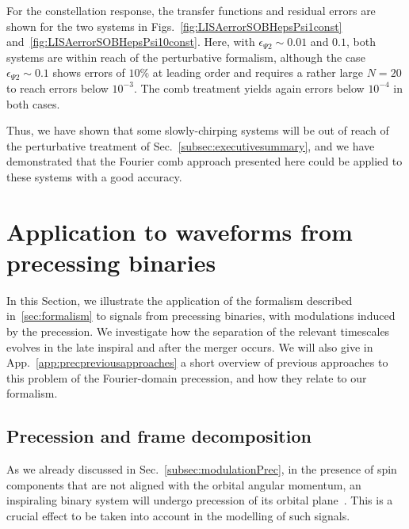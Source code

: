 \documentclass[aps,showpacs,twocolumn,
prd,superscriptaddress,nofootinbib]{revtex4-1}
\begin{document}
For the constellation response, the transfer functions and residual errors are shown for the two systems in Figs.~\ref{fig:LISAerrorSOBHepsPsi1const} and~\ref{fig:LISAerrorSOBHepsPsi10const}. Here, with $\epsilon_{\Psi 2} \sim 0.01$ and $0.1$, both systems are within reach of the perturbative formalism, although the case  $\epsilon_{\Psi 2} \sim 0.1$ shows errors of $10\%$ at leading order and requires a rather large $N=20$ to reach errors below $10^{-3}$. The comb treatment yields again errors below $10^{-4}$ in both cases.

Thus, we have shown that some slowly-chirping systems will be out of reach of the perturbative treatment of Sec.~\ref{subsec:executivesummary}, and we have demonstrated that the Fourier comb approach presented here could be applied to these systems with a good accuracy.


\section{Application to waveforms from precessing binaries}
\label{sec:precession}

In this Section, we illustrate the application of the formalism described in~\ref{sec:formalism} to signals from precessing binaries, with modulations induced by the precession. We investigate how the separation of the relevant timescales evolves in the late inspiral and after the merger occurs. We will also give in App.~\ref{app:precpreviousapproaches} a short overview of previous approaches to this problem of the Fourier-domain precession, and how they relate to our formalism.


\subsection{Precession and frame decomposition}
\label{subsec:precdef}

As we already discussed in Sec.~\ref{subsec:modulationPrec}, in the presence of spin components that are not aligned with the orbital angular momentum, an inspiraling binary system will undergo precession of its orbital plane~\cite{Apostolatos+94, Kidder95}. This is a crucial effect to be taken into account in the modelling of such signals.
\end{document}
